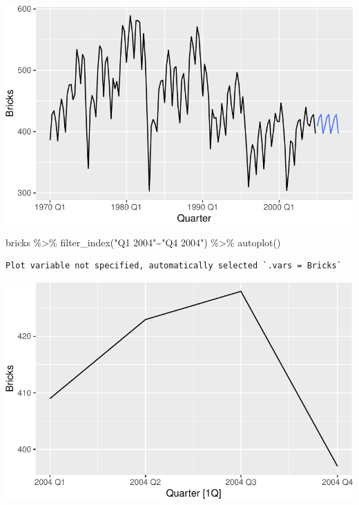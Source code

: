 \documentclass[
  letterpaper,
  DIV=11,
  numbers=noendperiod]{scrartcl}
\newenvironment{Shaded}{\begin{snugshade}}{\end{snugshade}}
\newcommand{\FunctionTok}[1]{\textcolor[rgb]{0.28,0.35,0.67}{#1}}
\newcommand{\NormalTok}[1]{\textcolor[rgb]{0.00,0.23,0.31}{#1}}
\newcommand{\SpecialCharTok}[1]{\textcolor[rgb]{0.37,0.37,0.37}{#1}}
\newcommand{\StringTok}[1]{\textcolor[rgb]{0.13,0.47,0.30}{#1}}
\begin{document}
\begin{center}
\includegraphics{chapter5_review_files/figure-pdf/unnamed-chunk-16-1.pdf}
\end{center}

\begin{Shaded}
\begin{Highlighting}[]
\NormalTok{bricks }\SpecialCharTok{\%\textgreater{}\%}
  \FunctionTok{filter\_index}\NormalTok{(}\StringTok{"Q1 2004"}\SpecialCharTok{\textasciitilde{}}\StringTok{"Q4 2004"}\NormalTok{) }\SpecialCharTok{\%\textgreater{}\%}
  \FunctionTok{autoplot}\NormalTok{()}
\end{Highlighting}
\end{Shaded}

\begin{verbatim}
Plot variable not specified, automatically selected `.vars = Bricks`
\end{verbatim}

\begin{center}
\includegraphics{chapter5_review_files/figure-pdf/unnamed-chunk-17-1.pdf}
\end{center}
\end{document}
